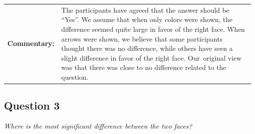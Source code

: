 \begin{tabular}{l p{}}
	{\bf Commentary:} & The participants have agreed that the answer should be ``Yes''. We assume that when only colors were shown, the difference seemed quite large in favor of the right face. When arrows were shown, we believe that some participants thought there was no difference, while others have seen a slight difference in favor of the right face. Our~original view was that there was close to no difference related to the question. \\
\end{tabular}

\clearpage

\subsection{Question 3}
\label{attch:complete_study_results-question3}

\begin{center}{\it Where is the most significant difference between the two faces?}\end{center}

